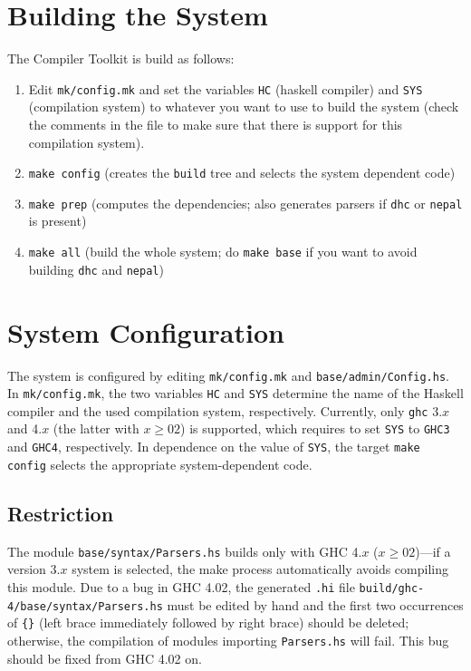 \documentclass{report}
\newcommand{\code}[1]{\texttt{#1}}
\begin{document}
\section{Building the System}

The Compiler Toolkit is build as follows:
%
\begin{enumerate}
\item Edit \code{mk/config.mk} and set the variables \code{HC} (haskell
  compiler) and \code{SYS} (compilation system) to whatever you want to use to
  build the system (check the comments in the file to make sure that there is
  support for this compilation system).
\item \code{make config} (creates the \code{build} tree and selects the system 
  dependent code)
\item \code{make prep} (computes the dependencies; also generates parsers if
  \code{dhc} or \code{nepal} is present)
\item \code{make all} (build the whole system; do \code{make base} if you want 
  to avoid building \code{dhc} and \code{nepal})
\end{enumerate}


\section{System Configuration}

The system is configured by editing \code{mk/config.mk} and
\code{base/admin/Config.hs}.  In \code{mk/config.mk}, the two variables
\code{HC} and \code{SYS} determine the name of the Haskell compiler and the
used compilation system, respectively.  Currently, only \code{ghc} 3.$x$ and
4.$x$ (the latter with $x\geq02$) is supported, which requires to set
\code{SYS} to \code{GHC3} and \code{GHC4}, respectively.  In dependence on the
value of \code{SYS}, the target \code{make config} selects the appropriate
system-dependent code.

\subsection{Restriction}

The module \code{base/syntax/Parsers.hs} builds only with GHC 4.$x$
($x\geq02$)---if a version 3.$x$ system is selected, the make process
automatically avoids compiling this module.  Due to a bug in GHC 4.02, the
generated \code{.hi} file \code{build/ghc-4/base/syntax/Parsers.hs} must be
edited by hand and the first two occurrences of \code{\{\}} (left brace
immediately followed by right brace) should be deleted; otherwise, the
compilation of modules importing \code{Parsers.hs} will fail.  This bug should
be fixed from GHC 4.02 on.
\end{document}
